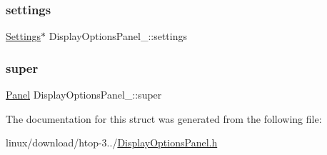 \subsubsection{\texorpdfstring{settings}{settings}}
{\footnotesize\ttfamily \hyperlink{Settings_8h_ad97e5960b63f21c02bf5e0e43c0ef002}{Settings}$\ast$ Display\+Options\+Panel\+\_\+\+::settings}

\mbox{\label{structDisplayOptionsPanel___aee633961cf454121dbfcf8d44dee3882}} 
\subsubsection{\texorpdfstring{super}{super}}
{\footnotesize\ttfamily \hyperlink{Panel_8h_a034d4c16521db412dc7a1e8536d16fae}{Panel} Display\+Options\+Panel\+\_\+\+::super}



The documentation for this struct was generated from the following file\+:\begin{DoxyCompactItemize}
\item 
linux/download/htop-\/3../\hyperlink{DisplayOptionsPanel_8h}{Display\+Options\+Panel.\+h}\end{DoxyCompactItemize}
